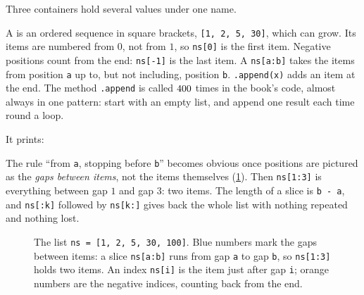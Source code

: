 Three containers hold several values under one name.

A  is an ordered sequence in square brackets, \texttt{[1, 2, 5, 30]}, which can grow. Its items are numbered from $0$, not from $1$, so \texttt{ns[0]} is the first item. Negative positions count from the end: \texttt{ns[-1]} is the last item. A  \texttt{ns[a:b]} takes the items from position \texttt{a} up to, but not including, position \texttt{b}. \texttt{.append(x)} adds an item at the end. The method \texttt{.append} is called $400$ times in the book's code, almost always in one pattern: start with an empty list, and append one result each time round a loop.

\noindent It prints:

The rule ``from \texttt{a}, stopping before \texttt{b}'' becomes obvious once positions are pictured as the \emph{gaps between items}, not the items themselves (\cref{T0a:fig:slices}). Then \texttt{ns[1:3]} is everything between gap $1$ and gap $3$: two items. The length of a slice is \texttt{b - a}, and \texttt{ns[:k]} followed by \texttt{ns[k:]} gives back the whole list with nothing repeated and nothing lost.

\begin{figure}[htbp]
\centering
{}
\caption{The list \texttt{ns = [1, 2, 5, 30, 100]}. Blue numbers mark the gaps between items: a slice \texttt{ns[a:b]} runs from gap \texttt{a} to gap \texttt{b}, so \texttt{ns[1:3]} holds two items. An index \texttt{ns[i]} is the item just after gap \texttt{i}; orange numbers are the negative indices, counting back from the end.}
\label{T0a:fig:slices}
\end{figure}

